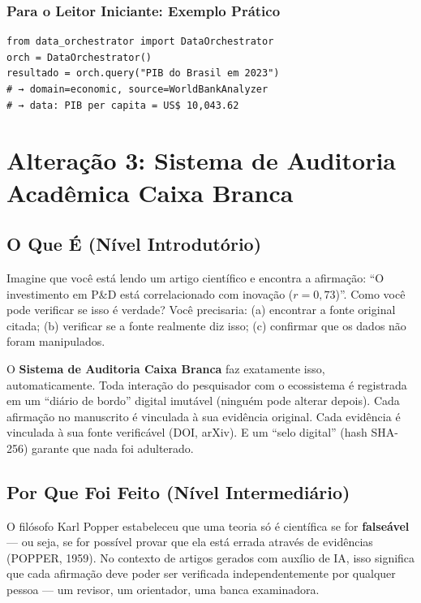 \documentclass[12pt,a4paper]{article}
\begin{document}
\subsubsection{Para o Leitor Iniciante: Exemplo Prático}

\begin{verbatim}
from data_orchestrator import DataOrchestrator
orch = DataOrchestrator()
resultado = orch.query("PIB do Brasil em 2023")
# → domain=economic, source=WorldBankAnalyzer
# → data: PIB per capita = US$ 10,043.62
\end{verbatim}

\section{Alteração 3: Sistema de Auditoria Acadêmica Caixa Branca}

\subsection{O Que É (Nível Introdutório)}

Imagine que você está lendo um artigo científico e encontra a afirmação: ``O investimento em P\&D está correlacionado com inovação ($r = 0,73$)''. Como você pode verificar se isso é verdade? Você precisaria: (a) encontrar a fonte original citada; (b) verificar se a fonte realmente diz isso; (c) confirmar que os dados não foram manipulados.

O \textbf{Sistema de Auditoria Caixa Branca} faz exatamente isso, automaticamente. Toda interação do pesquisador com o ecossistema é registrada em um ``diário de bordo'' digital imutável (ninguém pode alterar depois). Cada afirmação no manuscrito é vinculada à sua evidência original. Cada evidência é vinculada à sua fonte verificável (DOI, arXiv). E um ``selo digital'' (hash SHA-256) garante que nada foi adulterado.

\subsection{Por Que Foi Feito (Nível Intermediário)}

O filósofo Karl Popper estabeleceu que uma teoria só é científica se for \textbf{falseável} --- ou seja, se for possível provar que ela está errada através de evidências (POPPER, 1959). No contexto de artigos gerados com auxílio de IA, isso significa que cada afirmação deve poder ser verificada independentemente por qualquer pessoa --- um revisor, um orientador, uma banca examinadora.
\end{document}
